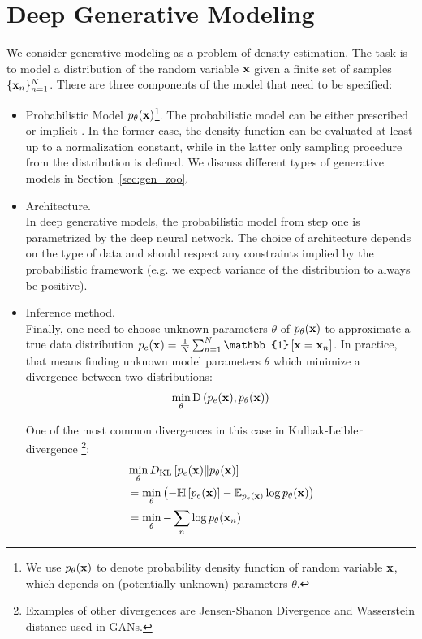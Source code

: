 \section{Deep Generative Modeling}
We consider generative modeling as a problem of density estimation.  The task is to model a distribution of the random variable ${\mathbf{x}}$ given a finite set of samples $\{{\mathbf{x}}_n\}_{n=1}^N$. There are three components of the model that need to be specified:
\begin{itemize}
\item Probabilistic Model $p_{\theta}({\mathbf{x}})$\footnote{
	We use $p_{\theta}({\mathbf{x}})$ to denote probability density function of random variable ${\mathbf{x}}$, which depends on (potentially unknown) parameters $\theta$. 
}.\newline
The probabilistic model can be either prescribed or  implicit \citep{diggle1984monte}. In the former case, the density function can be evaluated at least up to a normalization constant, while in the latter only sampling procedure from the distribution is defined. We discuss different types of generative models in Section~\ref{sec:gen_zoo}.

\item Architecture.\\
In deep generative models, the probabilistic model from step one is parametrized by the deep neural network. The choice of architecture depends on the type of data and should respect any constraints implied by the probabilistic framework (e.g. we expect variance of the distribution to always be positive).

\item Inference method. \\
Finally, one need to choose unknown parameters $\theta$ of $p_{\theta}({\mathbf{x}})$ to approximate a true data distribution $p_e(\rvx)=\frac{1}{N} \sum_{n=1}^N \mathbb{1}\left[\rvx = \rvx_n\right]$. In practice, that means finding unknown model parameters $\theta$ which minimize a divergence between two distributions:
\begin{equation}
\begin{aligned}
\min_{\theta} \text{D}\left(p_{e}({\mathbf{x}}), p_{\theta}({\mathbf{x}})\right) 
\end{aligned}
\end{equation}

One of the most common divergences in this case in Kulbak-Leibler  divergence \footnote{Examples of other divergences are Jensen-Shanon Divergence and Wasserstein distance used in GANs.}:
\begin{equation}
\begin{aligned}
&\min_{\theta} D_{\mathrm{KL}}\left[p_{e}({\mathbf{x}})\|p_{\theta}({\mathbf{x}})\right] \\
& = \min_{\theta}  \left( - \mathbb{H}\left[p_{e}({\mathbf{x}})\right] - \mathbb{E}_{p_{e}({\mathbf{x}})}\log p_{\theta}({\mathbf{x}})\right)\\
& = \min_{\theta}  - \sum_{n}\log p_{\theta}({\mathbf{x}}_n)\\
\end{aligned}
\end{equation}


\end{itemize}
